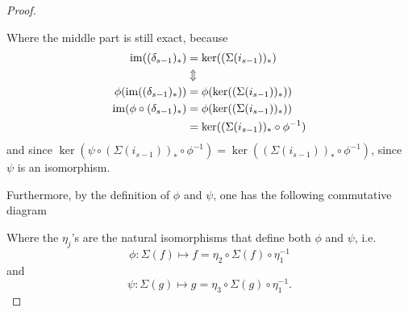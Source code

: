 \begin{proof}
\begin{center}
    \end{center}
    Where the middle part is still exact, because
    \begin{align*}
        \operatorname{im}((\delta_{s-1})_*) &= \ker((\Sigma(i_{s-1}))_*) \\
        &\Updownarrow \\
        \phi(\operatorname{im}((\delta_{s-1})_*)) &= \phi(\ker((\Sigma(i_{s-1}))_*)) \\
        \operatorname{im}(\phi \circ (\delta_{s-1})_*) &= \phi(\ker((\Sigma(i_{s-1}))_*)) \\
        &= \ker((\Sigma(i_{s-1}))_* \circ \phi^{-1})
    \end{align*}
    and since \( \ker(\psi \circ (\Sigma(i_{s-1}))_* \circ \phi^{-1}) = \ker((\Sigma(i_{s-1}))_* \circ \phi^{-1}) \), since \( \psi \) is an isomorphism.

    Furthermore, by the definition of \( \phi \) and \( \psi \), one has the following commutative diagram
    \begin{center}
    \end{center}
    Where the \( \eta_j \)'s are the natural isomorphisms that define both \( \phi \) and \( \psi \), i.e.
    \[
        \phi: \Sigma( f ) \mapsto f = \eta_2 \circ \Sigma( f ) \circ \eta_1^{-1}
    \]
    and
    \[
        \psi: \Sigma( g ) \mapsto g = \eta_3 \circ \Sigma( g ) \circ \eta_1^{-1}.
    \]


\end{proof}

